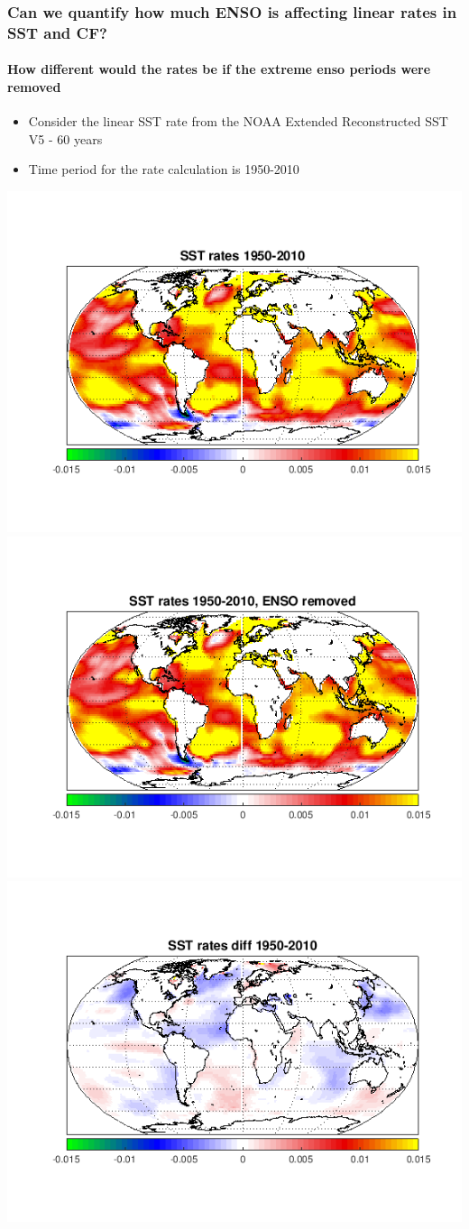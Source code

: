 \documentclass[10pt,t]{beamer}
\begin{document}
         
 \begin{frame}
   \frametitle{Can we quantify how much ENSO is affecting linear rates in SST and CF?}
   \framesubtitle{How different would the rates be if the extreme enso periods were removed}
   \vspace{-0.15in}
   \begin{itemize}
   \item Consider the linear SST rate from the NOAA Extended Reconstructed SST V5 - 60 years    
   \item Time period for the rate calculation is 1950-2010 
   \end{itemize}
   \vspace{0.1in}
   \centering
 \includegraphics[width=0.4\linewidth]{./figures/sst_rates_1950_2010.png}
 \includegraphics[width=0.4\linewidth]{./figures/sst_rates_1950_2010_enso_removed.png} \\ 
 \includegraphics[width=0.4\linewidth]{./figures/sst_rates_diff_1950_2010.png} 
 \end{frame}
\end{document}

